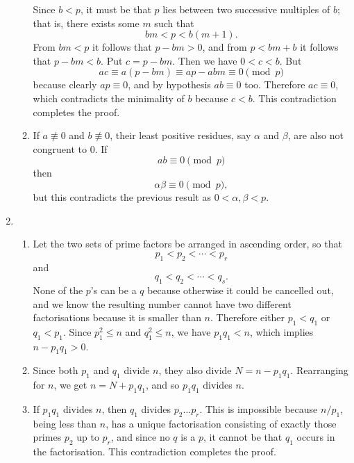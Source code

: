 \documentclass[a4paper]{article}
\begin{document}
\begin{enumerate}
\begin{enumerate}
    Since \(b<p\), it must be that \(p\) lies between
    two successive multiples of \(b\); that is, there exists
    some \(m\) such that \[bm<p<b(m+1).\]
    From \(bm<p\) it follows that \(p-bm>0\), and from
    \(p<bm+b\) it follows that \(p-bm<b\). Put \(c=p-bm\).
    Then we have \(0<c<b\). But \[ac\equiv a(p-bm)\equiv ap-abm\equiv0\pmod{p}\] because clearly \(ap\equiv0\), and by hypothesis \(ab\equiv0\) too.
    Therefore \(ac\equiv0\), which contradicts the minimality of \(b\)
    because \(c<b\). This contradiction completes the proof.
  \item If \(a\not\equiv0\) and \(b\not\equiv0\), their least positive
    residues, say \(\alpha\) and \(\beta\),  are also not congruent to
    \(0\). If \[ab\equiv0\pmod{p}\] then \[\alpha\beta\equiv0\pmod{p},\]
    but this contradicts the previous result as \(0<\alpha,\beta<p\).
  \end{enumerate}
  \item
    \begin{enumerate}
    \item Let the two sets of prime factors be
      arranged in ascending order, so that \[p_1<p_2<\cdots<p_r\]
      and \[q_1<q_2<\cdots<q_s.\] None of the \(p\)'s can be a
      \(q\) because otherwise it could be cancelled out, and we
      know the resulting number cannot have two different factorisations
      because it is smaller than \(n\). Therefore either \(p_1<q_1\)
      or \(q_1<p_1\). Since \(p_1^2\le n\) and \(q_1^2\le n\), we have
      \(p_1q_1<n\), which implies \(n-p_1q_1>0\).
    \item Since both \(p_1\) and \(q_1\) divide \(n\), they also
      divide \(N=n-p_1q_1\). Rearranging for \(n\), we get
      \(n=N+p_1q_1\), and so \(p_1q_1\) divides \(n\).
    \item If \(p_1q_1\) divides \(n\), then \(q_1\) divides
      \(p_2\ldots p_r\). This is impossible because \(n/p_1\), being
      less than \(n\), has a unique factorisation consisting of
      exactly those primes \(p_2\) up to \(p_r\), and since no \(q\)
      is a \(p\), it cannot be that \(q_1\) occurs in the factorisation.
      This contradiction completes the proof.
    \end{enumerate}
\end{enumerate}
\end{document}
